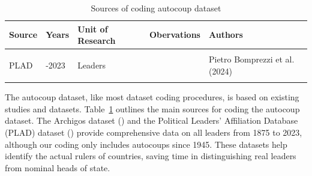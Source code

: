 \documentclass[
  12pt,
]{report}
\begin{document}
\begin{longtable}{@{\extracolsep{\fill}}>{\raggedright\arraybackslash}p{\dimexpr 60.00pt -2\tabcolsep-1.5\arrayrulewidth}>{\raggedleft\arraybackslash}p{\dimexpr 60.00pt -2\tabcolsep-1.5\arrayrulewidth}>{\raggedright\arraybackslash}p{\dimexpr 60.00pt -2\tabcolsep-1.5\arrayrulewidth}>{\raggedleft\arraybackslash}p{\dimexpr 60.00pt -2\tabcolsep-1.5\arrayrulewidth}>{\raggedright\arraybackslash}p{\dimexpr 150.00pt -2\tabcolsep-1.5\arrayrulewidth}}

\caption{\label{tbl-source}Sources of coding autocoup dataset}

\tabularnewline

\toprule
Source & Years & Unit of Research & Obervations & Authors \\ 
\midrule\addlinespace[2.5pt]
{\cellcolor[HTML]{EDEDE9}{\textcolor[HTML]{000000}{Archigos}}} & {\cellcolor[HTML]{EDEDE9}{\textcolor[HTML]{000000}{1875-2015}}} & {\cellcolor[HTML]{EDEDE9}{\textcolor[HTML]{000000}{Leaders}}} & {\cellcolor[HTML]{EDEDE9}{\textcolor[HTML]{000000}{3409}}} & {\cellcolor[HTML]{EDEDE9}{\textcolor[HTML]{000000}{ Hein Goemans, Kristian Skrede Gleditsch, Giacomo Chiozza (2009)}}} \\ 
PLAD & 1989-2023 & Leaders & 1334 & Pietro Bomprezzi et al. (2024) \\ 
{\cellcolor[HTML]{EDEDE9}{\textcolor[HTML]{000000}{Incumbent Takeover}}} & {\cellcolor[HTML]{EDEDE9}{\textcolor[HTML]{000000}{1913-2019}}} & {\cellcolor[HTML]{EDEDE9}{\textcolor[HTML]{000000}{Incumbent takeovers}}} & {\cellcolor[HTML]{EDEDE9}{\textcolor[HTML]{000000}{279}}} & {\cellcolor[HTML]{EDEDE9}{\textcolor[HTML]{000000}{Alexander Baturo, Jakob Tolstrup (2022)}}} \\ 
\bottomrule

\end{longtable}

\endgroup

The autocoup dataset, like most dataset coding procedures, is based on
existing studies and datasets. Table~\ref{tbl-source} outlines the main
sources for coding the autocoup dataset. The Archigos dataset
() and
the Political Leaders' Affiliation Database (PLAD) dataset
() provide
comprehensive data on all leaders from 1875 to 2023, although our coding
only includes autocoups since 1945. These datasets help identify the
actual rulers of countries, saving time in distinguishing real leaders
from nominal heads of state.
\end{document}
